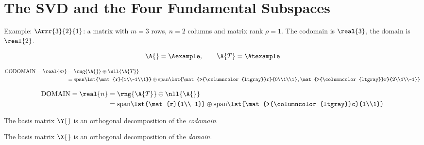 \break
\section{The SVD and the Four Fundamental Subspaces}
Example: $\Arrr{3}{2}{1}$: a matrix with $m=3$ rows, $n=2$ columns and matrix rank $\rho=1$. The codomain is $\real{3}$, the domain is $\real{2}$.

\begin{equation*}
  \A{} = \Aexample, \qquad \A{T} = \Atexample
\end{equation*}

\begin{equation*}
  \begin{split}
    \text{CODOMAIN} =\real{m} &= \rng{\A{}} \oplus \nll{\A{T}}\\
      &= \text{span}\lst{\mat{r}{1\\-1\\1}} \oplus \text{span}\lst{\mat{>{\columncolor{ltgray}}r}{0\\1\\1},\mat{>{\columncolor{ltgray}}r}{2\\1\\-1}}\\
  \end{split}
\end{equation*}

\begin{equation*}
  \begin{split}
    \text{DOMAIN} =\real{n} &= \rng{\A{T}} \oplus \nll{\A{}}\\
      &= \text{span}\lst{\mat{r}{1\\-1}} \oplus \text{span}\lst{\mat{>{\columncolor{ltgray}}c}{1\\1}}\\
  \end{split}
\end{equation*}

The basis matrix $\Y{}$ is an orthogonal decomposition of the \textit{codomain}.

The basis matrix $\X{}$ is an orthogonal decomposition of the \textit{domain}.

